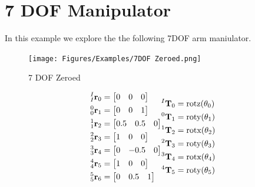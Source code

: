 \section{7 DOF Manipulator}  \label{sec:7dof}

\noindent In this example we explore the the following 7DOF arm maniulator.

\begin{figure}[H]
    \centering
    \texttt{[image: Figures/Examples/7DOF Zeroed.png]}
    \caption{7 DOF Zeroed}
    \label{fig:7dofzero}
\end{figure}

\begin{align*}
    \begin{split}
        {^I_I \r _0} &= \begin{bmatrix} 0 & 0 & 0\end{bmatrix} \\
        {^0_0 \r _1} &= \begin{bmatrix} 0 & 0 & 1 \end{bmatrix} \\ 
        {^1_1 \r _2} &= \begin{bmatrix} 0.5& 0.5& 0 \end{bmatrix}\\
        {^2_2 \r _3} &= \begin{bmatrix} 1& 0& 0 \end{bmatrix}\\
        {^3_3 \r _4} &= \begin{bmatrix} 0& -0.5& 0\end{bmatrix}\\
        {^4_4 \r _5} &= \begin{bmatrix} 1& 0& 0 \end{bmatrix}\\
        {^5_5 \r _6} &= \begin{bmatrix} 0 & 0.5 & 1 \end{bmatrix}
    \end{split}
    \begin{split}
        {^I \T_0} &= \text{rotz}(\theta_0)\\
        {^0 \T_1} &= \text{roty}(\theta_1)\\
        {^1 \T_2} &= \text{rotx}(\theta_2)\\
        {^2 \T_3} &= \text{roty}(\theta_3)\\
        {^3 \T_4} &= \text{rotx}(\theta_4)\\
        {^4 \T_5} &= \text{roty}(\theta_5)\\

\end{split}
\end{align*}
